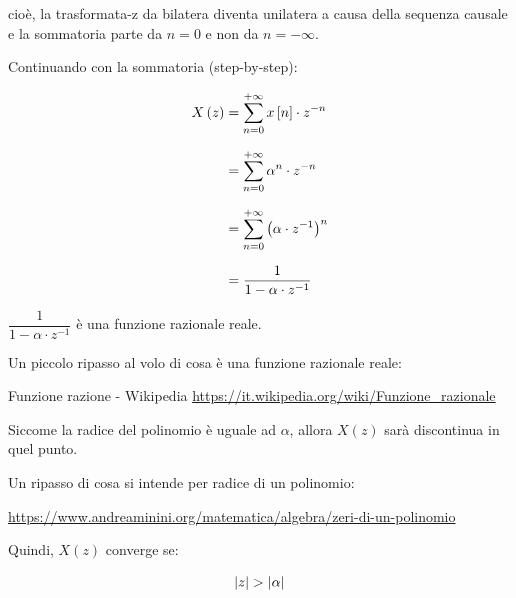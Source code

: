 cioè, la trasformata-z da bilatera diventa unilatera a causa della sequenza causale e la sommatoria parte da $n = 0$ e non da $n = - \infty$. \newline 

Continuando con la sommatoria (step-by-step): 

{
    \Large 
    \begin{equation}
        \setlength{\jot}{10pt} %
        \begin{split}
        X \left(z\right) 
        &= 
        \sum_{n = 0}^{+ \infty}
        x \left[ n\right] \cdot z^{- n}     
        \\
        &= 
        \sum_{n = 0}^{+ \infty}
        \alpha^{n} \cdot z^{- n} 
        \\
        &= 
        \sum_{n = 0}^{+ \infty}
        \left( \alpha \cdot z^{-1}\right)^{n}
        \\
        &= 
        \dfrac{1}{1 - \alpha \cdot z^{-1}}
        \end{split}
    \end{equation}
}

$\dfrac{1}{1 - \alpha \cdot z^{-1}}$ è una funzione razionale reale. \newline 

\begin{tcolorbox}
    Un piccolo ripasso al volo di cosa è una funzione razionale reale: \newline 

    Funzione razione - Wikipedia \url{https://it.wikipedia.org/wiki/Funzione_razionale}
\end{tcolorbox}

Siccome la radice del polinomio è uguale ad $\alpha$, 
allora $X \left(z\right)$ sarà discontinua in quel punto. \newline 

\begin{tcolorbox}
    Un ripasso di cosa si intende per radice di un polinomio: \newline 
    
    \url{https://www.andreaminini.org/matematica/algebra/zeri-di-un-polinomio}
\end{tcolorbox}

Quindi, $X \left( z\right)$ converge se: 

{
    \Large 
    \begin{equation}
        \abs{z} > \abs{\alpha}
    \end{equation}
}

